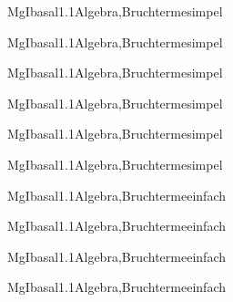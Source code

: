 \documentclass[12pt]{article}
\begin{document}
    \begin{Add}{MgI}{basal1.1}{Algebra,Bruchterme}{simpel}
    \solution{ }
    \end{Add}
    \begin{Add}{MgI}{basal1.1}{Algebra,Bruchterme}{simpel}
    \end{Add}
    

    \begin{Add}{MgI}{basal1.1}{Algebra,Bruchterme}{simpel}
    \solution{ }
    \end{Add}
    \begin{Add}{MgI}{basal1.1}{Algebra,Bruchterme}{simpel}
    \end{Add}
    

    \begin{Add}{MgI}{basal1.1}{Algebra,Bruchterme}{simpel}
    \solution{ }
    \end{Add}
    \begin{Add}{MgI}{basal1.1}{Algebra,Bruchterme}{simpel}
    \end{Add}
    

    \begin{Add}{MgI}{basal1.1}{Algebra,Bruchterme}{einfach}
    \solution{ }
    \end{Add}
    \begin{Add}{MgI}{basal1.1}{Algebra,Bruchterme}{einfach}
    \end{Add}
    

    \begin{Add}{MgI}{basal1.1}{Algebra,Bruchterme}{einfach}
    \solution{ }
    \end{Add}
    \begin{Add}{MgI}{basal1.1}{Algebra,Bruchterme}{einfach}
    \end{Add}
    
\end{document}
